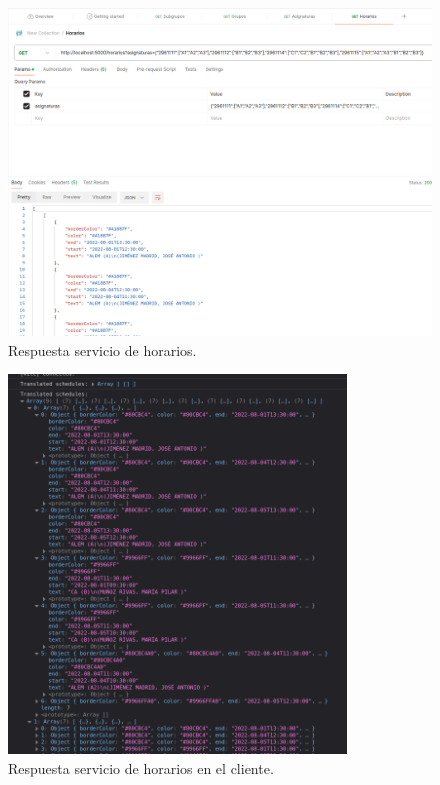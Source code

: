 \begin{figure}[H]
    \centering
    \includegraphics[width=1\textwidth]{./imagenes/get_horarios_respuesta.png}
    \caption{Respuesta servicio de horarios.}
    \label{fig:get_horarios_respuesta}
\end{figure}

\begin{figure}[H]
    \centering
    \includegraphics[width=0.8\textwidth]{./imagenes/get_horarios_respuesta_cliente.png}
    \caption{Respuesta servicio de horarios en el cliente.}
    \label{fig:get_horarios_respuesta_cliente}
\end{figure}

